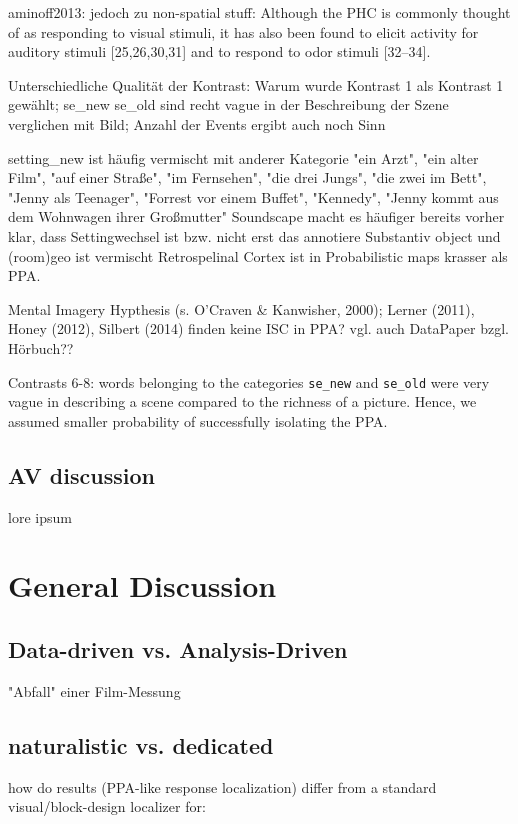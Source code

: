 \documentclass[english]{article}
\begin{document}
aminoff2013: jedoch zu non-spatial stuff: Although the PHC is commonly thought
of as responding to visual stimuli, it has also been found to elicit activity
for auditory stimuli [25,26,30,31] and to respond to odor stimuli [32–34].

Unterschiedliche Qualität der Kontrast: Warum wurde Kontrast 1 als Kontrast 1
gewählt; se\_new se\_old sind recht vague in der Beschreibung der Szene
verglichen mit Bild; Anzahl der Events ergibt auch noch Sinn

setting\_new ist häufig vermischt mit anderer Kategorie "ein Arzt", "ein alter
Film", "auf einer Straße", "im Fernsehen", "die drei Jungs", "die zwei im Bett",
"Jenny als Teenager", "Forrest vor einem Buffet", "Kennedy", "Jenny kommt aus
dem Wohnwagen ihrer Großmutter" Soundscape macht es häufiger bereits vorher
klar, dass Settingwechsel ist bzw. nicht erst das annotiere Substantiv object
und (room)geo ist vermischt Retrospelinal Cortex ist in Probabilistic maps
krasser als PPA.

Mental Imagery Hypthesis (s. O'Craven \& Kanwisher, 2000); Lerner (2011), Honey
(2012), Silbert (2014) finden keine ISC in PPA? vgl. auch DataPaper bzgl.
Hörbuch??

Contrasts 6-8: words belonging to the categories \texttt{se\_new} and
\texttt{se\_old} were very vague in describing a scene compared to the richness
of a picture. Hence, we assumed smaller probability of successfully isolating
the PPA.


\subsection{AV discussion}
lore ipsum

\section*{General Discussion}

\subsection{Data-driven vs. Analysis-Driven}
"Abfall" einer Film-Messung

\subsection{naturalistic vs. dedicated} how do results (PPA-like response
localization) differ from a standard visual/block-design localizer for:
\end{document}
